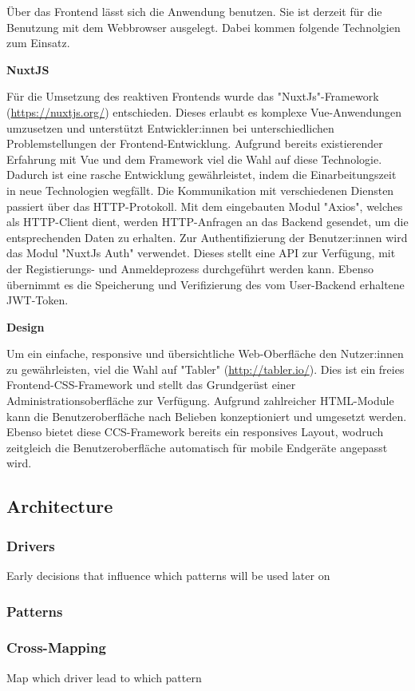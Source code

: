 Über das Frontend lässt sich die Anwendung benutzen. Sie ist derzeit für die Benutzung mit dem Webbrowser ausgelegt. Dabei kommen folgende Technolgien zum Einsatz.

\textbf{NuxtJS}

Für die Umsetzung des reaktiven Frontends wurde das "NuxtJs"-Framework (\href{https://nuxtjs.org/}{https://nuxtjs.org/}) entschieden. Dieses erlaubt es komplexe Vue-Anwendungen umzusetzen und unterstützt Entwickler:innen
bei unterschiedlichen Problemstellungen der Frontend-Entwicklung. Aufgrund bereits existierender Erfahrung mit Vue und dem Framework viel die Wahl auf diese Technologie.
Dadurch ist eine rasche Entwicklung gewährleistet, indem die Einarbeitungszeit in neue Technologien wegfällt. Die Kommunikation mit verschiedenen Diensten passiert
über das HTTP-Protokoll. Mit dem eingebauten Modul "Axios", welches als HTTP-Client dient, werden HTTP-Anfragen an das Backend gesendet, um die entsprechenden Daten 
zu erhalten. Zur Authentifizierung der Benutzer:innen wird das Modul "NuxtJs Auth" verwendet. Dieses stellt eine API zur Verfügung, mit der Registierungs- und Anmeldeprozess durchgeführt werden kann.
Ebenso übernimmt es die Speicherung und Verifizierung des vom User-Backend erhaltene JWT-Token.

\textbf{Design}

Um ein einfache, responsive und übersichtliche Web-Oberfläche den Nutzer:innen zu gewährleisten, viel die Wahl auf "Tabler" (\href{http://tabler.io/}{http://tabler.io/}). Dies ist ein freies Frontend-CSS-Framework
und stellt das Grundgerüst einer Administrationsoberfläche zur Verfügung. Aufgrund zahlreicher HTML-Module kann die Benutzeroberfläche nach Belieben konzeptioniert und 
umgesetzt werden. Ebenso bietet diese CCS-Framework bereits ein responsives Layout, wodruch zeitgleich die Benutzeroberfläche automatisch für mobile Endgeräte angepasst wird.

\subsection{Architecture}
\subsubsection{Drivers}
Early decisions that influence which patterns will be used later on
\subsubsection{Patterns}
\subsubsection{Cross-Mapping}
Map which driver lead to which pattern